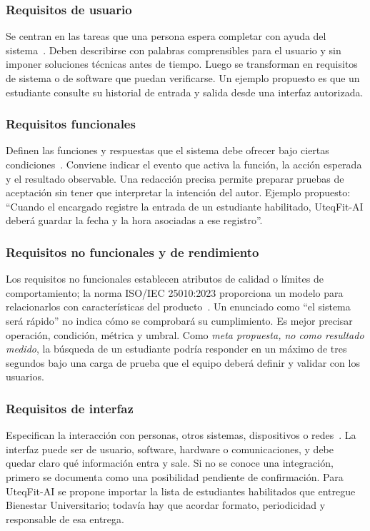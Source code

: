 \subsubsection{Requisitos de usuario}
Se centran en las tareas que una persona espera completar con ayuda del sistema~\cite{swebok2024}. Deben describirse con palabras comprensibles para el usuario y sin imponer soluciones técnicas antes de tiempo. Luego se transforman en requisitos de sistema o de software que puedan verificarse. Un ejemplo propuesto es que un estudiante consulte su historial de entrada y salida desde una interfaz autorizada.

\subsubsection{Requisitos funcionales}
Definen las funciones y respuestas que el sistema debe ofrecer bajo ciertas condiciones~\cite{swebok2024,ieee29148}. Conviene indicar el evento que activa la función, la acción esperada y el resultado observable. Una redacción precisa permite preparar pruebas de aceptación sin tener que interpretar la intención del autor. Ejemplo propuesto: ``Cuando el encargado registre la entrada de un estudiante habilitado, UteqFit-AI deberá guardar la fecha y la hora asociadas a ese registro''.

\subsubsection{Requisitos no funcionales y de rendimiento}
Los requisitos no funcionales establecen atributos de calidad o límites de comportamiento; la norma ISO/IEC 25010:2023 proporciona un modelo para relacionarlos con características del producto~\cite{iso25010,swebok2024}. Un enunciado como ``el sistema será rápido'' no indica cómo se comprobará su cumplimiento. Es mejor precisar operación, condición, métrica y umbral. Como \emph{meta propuesta, no como resultado medido}, la búsqueda de un estudiante podría responder en un máximo de tres segundos bajo una carga de prueba que el equipo deberá definir y validar con los usuarios.

\subsubsection{Requisitos de interfaz}
Especifican la interacción con personas, otros sistemas, dispositivos o redes~\cite{ieee29148,swebok2024}. La interfaz puede ser de usuario, software, hardware o comunicaciones, y debe quedar claro qué información entra y sale. Si no se conoce una integración, primero se documenta como una posibilidad pendiente de confirmación. Para UteqFit-AI se propone importar la lista de estudiantes habilitados que entregue Bienestar Universitario; todavía hay que acordar formato, periodicidad y responsable de esa entrega.

